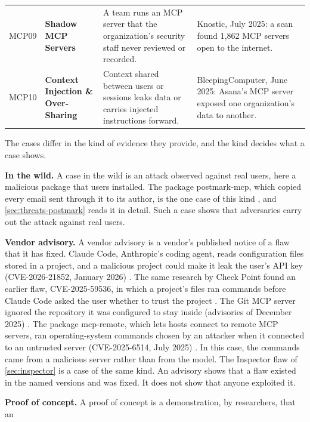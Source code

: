 \begin{table}[tb]
\begin{adjustbox}{width=\textwidth}
\begin{tabularx}{\textwidth}{L{0.065\textwidth}L{0.2\textwidth}L{0.33\textwidth}X}
    MCP09 & \textbf{Shadow MCP Servers} & A team runs an MCP server that the organization's security staff never reviewed or recorded. & Knostic, July 2025: a scan found 1,862 MCP servers open to the internet. \\
    MCP10 & \textbf{Context Injection \& Over-Sharing} & Context shared between users or sessions leaks data or carries injected instructions forward. & BleepingComputer, June 2025: Asana's MCP server exposed one organization's data to another. \\
    \bottomrule
  \end{tabularx}\end{adjustbox}
\end{table}

The cases differ in the kind of evidence they provide, and the kind decides what a case shows.
\bi
\item \textbf{In the wild.} A case in the wild is an attack observed against real users, here a
malicious package that users installed. The package postmark-mcp, which copied every email sent
through it to its author, is the one case of this kind \citep{dardikman2025postmark}, and
\cref{sec:threats-postmark} reads it in detail. Such a case shows that adversaries carry out the
attack against real users.
\item \textbf{Vendor advisory.} A vendor advisory is a vendor's published notice of a flaw that it
has fixed. Claude Code, Anthropic's coding agent, reads configuration files stored in a project,
and a malicious project could make it leak the user's API key (CVE-2026-21852, January 2026)
\citep{ghsa-jh7p-claude-code}. The same research by Check Point found an earlier flaw,
CVE-2025-59536, in which a project's files ran commands before Claude Code asked the user whether
to trust the project \citep{lyons2026claudecode}. The Git MCP server ignored the repository it was
configured to stay inside (advisories of December 2025)
\citep{ghsa-j22h-mcp-server-git,lakshmanan2026gitmcp}. The package mcp-remote, which lets hosts
connect to remote MCP servers, ran operating-system commands chosen by an attacker when it
connected to an untrusted server (CVE-2025-6514, July 2025) \citep{peles2025mcpremote}. In this
case, the commands came from a malicious server rather than from the model. The Inspector flaw of
\cref{sec:inspector} is a case of the same kind. An advisory shows that a flaw existed in the named
versions and was fixed. It does not show that anyone exploited it.
\item \textbf{Proof of concept.} A proof of concept is a demonstration, by researchers, that an
